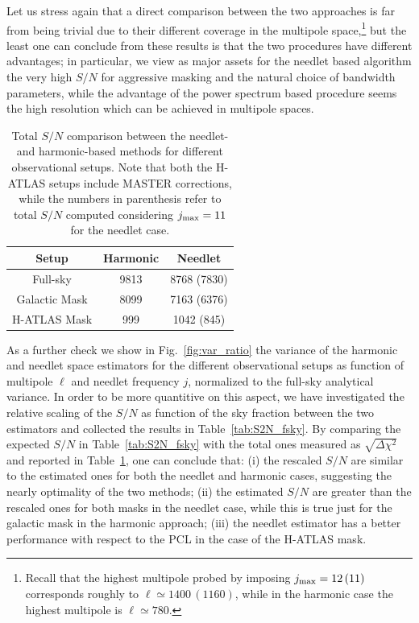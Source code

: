 \documentclass[a4paper,11pt]{article}
\begin{document}
Let us stress again that a direct comparison between the two approaches is far from being trivial due to their different coverage in the multipole space,\footnote{Recall that the highest multipole probed by imposing $j_{\rm max}=12 \,(11)$ corresponds roughly to $\ell \simeq 1400 \, (1160)$, while in the harmonic case the highest multipole is $\ell \simeq 780$.} but the least one can conclude from these results is that the two procedures have different advantages; in particular, we view as major assets for the needlet based algorithm the very high $S/N$ for aggressive masking and the natural choice of bandwidth parameters, while the advantage of the power spectrum based procedure seems the high resolution which can be achieved in multipole spaces.
%
\begin{table}[t]
\centering
\caption{Total $S/N$ comparison between the needlet- and harmonic-based methods for different observational setups. Note that both the H-ATLAS setups include MASTER corrections, while the numbers in parenthesis refer to total $S/N$ computed considering $j_{\rm max}=11$ for the needlet case.}
\begin{tabular}{ccc}
\toprule
\midrule
Setup & Harmonic & Needlet \\
\midrule
Full-sky & 9813 & 8768 (7830) \\
Galactic Mask & 8099 &  7163 (6376)\\
H-ATLAS Mask & 999 & 1042 (845)\\
\bottomrule
\end{tabular}
\label{tab:S2N}
\end{table}
%

As a further check we show in Fig.~\ref{fig:var_ratio} the variance of the harmonic and needlet space 
estimators for the different observational setups as function of multipole $\ell$ and needlet frequency $j$,
normalized to the full-sky analytical variance. In order to be more quantitive on this aspect, we have investigated the relative scaling of the $S/N$ as function of the sky fraction between the two estimators and collected the results in Table~\ref{tab:S2N_fsky}. By comparing the expected $S/N$ in Table~\ref{tab:S2N_fsky} with the total ones measured as $\sqrt{\Delta\chi^2}$ and reported in Table~\ref{tab:S2N}, one can conclude that: (i) the rescaled $S/N$ are similar to the estimated ones for both the needlet and harmonic cases, suggesting the nearly optimality of the two methods; (ii)  the estimated $S/N$ are greater than the rescaled ones for both masks in the needlet case, while this is true just for the galactic mask in the harmonic approach; (iii) the needlet estimator has a better performance with respect to the PCL in the case of the H-ATLAS mask.
\end{document}

